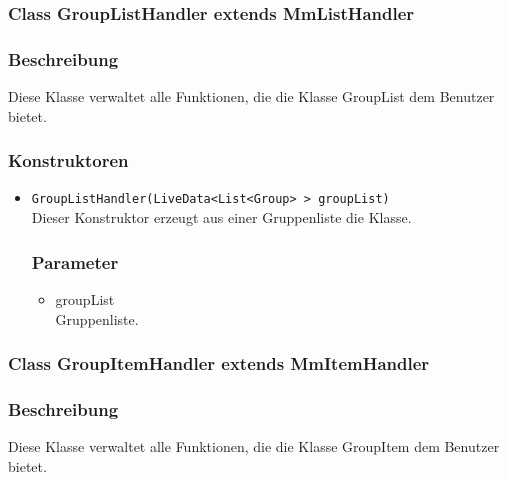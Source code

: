 \documentclass[a4paper]{scrreprt}
\begin{document}

\subsubsection{Class GroupListHandler extends MmListHandler}
\subsubsection*{Beschreibung}
Diese Klasse verwaltet alle Funktionen, die die Klasse GroupList dem Benutzer bietet.

\subsubsection*{Konstruktoren}
\begin{addmargin}[25pt]{0pt}
\begin{itemize}

\item \texttt{GroupListHandler(LiveData<List<Group> > groupList)}\\
	Dieser Konstruktor erzeugt aus einer Gruppenliste die Klasse.

	\subsubsection*{Parameter}
	\begin{itemize}
	\item groupList \\
		Gruppenliste.
	\end{itemize}

\end{itemize}
\end{addmargin}


\subsubsection{Class GroupItemHandler extends MmItemHandler}
\subsubsection*{Beschreibung}
Diese Klasse verwaltet alle Funktionen, die die Klasse GroupItem dem Benutzer bietet.
\end{document}
